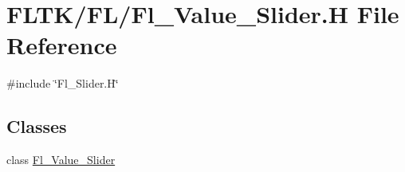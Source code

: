 \hypertarget{_fl___value___slider_8_h}{}\section{F\+L\+T\+K/\+F\+L/\+Fl\+\_\+\+Value\+\_\+\+Slider.H File Reference}
\label{_fl___value___slider_8_h}
{\ttfamily \#include \char`\"{}Fl\+\_\+\+Slider.\+H\char`\"{}}\newline
\subsection*{Classes}
\begin{DoxyCompactItemize}
\item 
class \hyperlink{class_fl___value___slider}{Fl\+\_\+\+Value\+\_\+\+Slider}
\end{DoxyCompactItemize}
